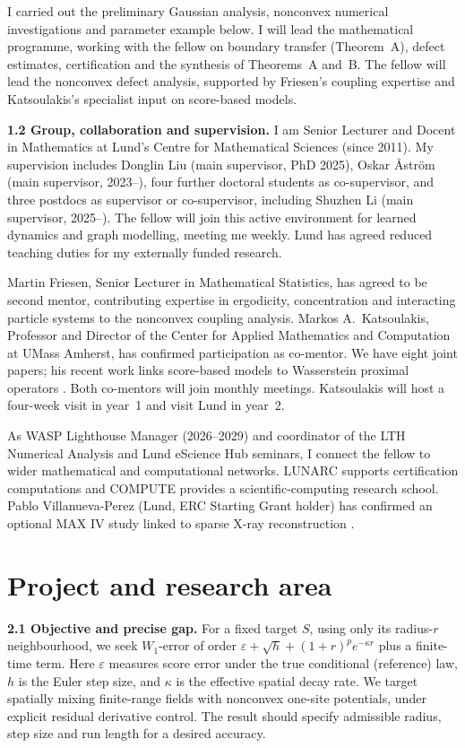 \documentclass[12pt,a4paper]{article}
\newcommand{\W}{W_1}
\begin{document}
I carried out the preliminary Gaussian analysis, nonconvex numerical investigations and parameter example below. I will lead the mathematical programme, working with the fellow on boundary transfer (Theorem~A), defect estimates, certification and the synthesis of Theorems~A and~B. The fellow will lead the nonconvex defect analysis, supported by Friesen's coupling expertise and Katsoulakis's specialist input on score-based models.

\textbf{1.2 Group, collaboration and supervision.}
I am Senior Lecturer and Docent in Mathematics at Lund's Centre for Mathematical Sciences (since 2011). My supervision includes Donglin Liu (main supervisor, PhD 2025), Oskar \AA{}str\"om (main supervisor, 2023--), four further doctoral students as co-supervisor, and three postdocs as supervisor or co-supervisor, including Shuzhen Li (main supervisor, 2025--). The fellow will join this active environment for learned dynamics and graph modelling, meeting me weekly. Lund has agreed reduced teaching duties for my externally funded research.

Martin Friesen, Senior Lecturer in Mathematical Statistics, has agreed to be second mentor, contributing expertise in ergodicity, concentration and interacting particle systems to the nonconvex coupling analysis. Markos A.\ Katsoulakis, Professor and Director of the Center for Applied Mathematics and Computation at UMass Amherst, has confirmed participation as co-mentor. We have eight joint papers; his recent work links score-based models to Wasserstein proximal operators \cite{ZLLKO24}. Both co-mentors will join monthly meetings. Katsoulakis will host a four-week visit in year~1 and visit Lund in year~2.

As WASP Lighthouse Manager (2026--2029) and coordinator of the LTH Numerical Analysis and Lund eScience Hub seminars, I connect the fellow to wider mathematical and computational networks. LUNARC supports certification computations and COMPUTE provides a scientific-computing research school. Pablo Villanueva-Perez (Lund, ERC Starting Grant holder) has confirmed an optional MAX IV study linked to sparse X-ray reconstruction \cite{Zhang25}.

\section{Project and research area}
\textbf{2.1 Objective and precise gap.}
For a fixed target $S$, using only its radius-$r$ neighbourhood, we seek $\W$-error of order $\varepsilon+\sqrt h+(1+r)^p e^{-\kappa r}$ plus a finite-time term. Here $\varepsilon$ measures score error under the true conditional (reference) law, $h$ is the Euler step size, and $\kappa$ is the effective spatial decay rate. We target spatially mixing finite-range fields with nonconvex one-site potentials, under explicit residual derivative control. The result should specify admissible radius, step size and run length for a desired accuracy.
\end{document}
